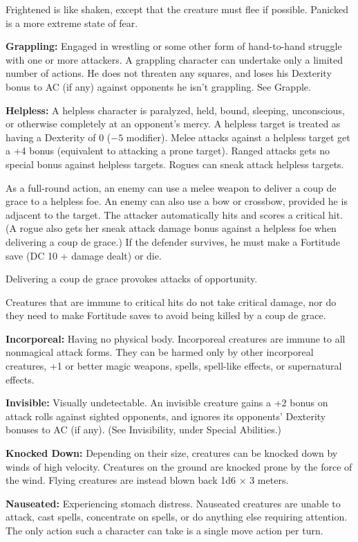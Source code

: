 Frightened is like shaken, except that the creature must flee if possible. Panicked is a more extreme state of fear.

\textbf{Grappling:} Engaged in wrestling or some other form of hand-to-hand struggle with one or more attackers. A grappling character can undertake only a limited number of actions. He does not threaten any squares, and loses his Dexterity bonus to AC (if any) against opponents he isn't grappling. See Grapple.

\textbf{Helpless:} A helpless character is paralyzed, held, bound, sleeping, unconscious, or otherwise completely at an opponent's mercy. A helpless target is treated as having a Dexterity of 0 ($-5$ modifier). Melee attacks against a helpless target get a +4 bonus (equivalent to attacking a prone target). Ranged attacks gets no special bonus against helpless targets. Rogues can sneak attack helpless targets.

As a full-round action, an enemy can use a melee weapon to deliver a coup de grace to a helpless foe. An enemy can also use a bow or crossbow, provided he is adjacent to the target. The attacker automatically hits and scores a critical hit. (A rogue also gets her sneak attack damage bonus against a helpless foe when delivering a coup de grace.) If the defender survives, he must make a Fortitude save (DC 10 + damage dealt) or die.

Delivering a coup de grace provokes attacks of opportunity.

Creatures that are immune to critical hits do not take critical damage, nor do they need to make Fortitude saves to avoid being killed by a coup de grace.

\textbf{Incorporeal:} Having no physical body. Incorporeal creatures are immune to all nonmagical attack forms. They can be harmed only by other incorporeal creatures, +1 or better magic weapons, spells, spell-like effects, or supernatural effects.

\textbf{Invisible:} Visually undetectable. An invisible creature gains a +2 bonus on attack rolls against sighted opponents, and ignores its opponents' Dexterity bonuses to AC (if any). (See Invisibility, under Special Abilities.)

\textbf{Knocked Down:} Depending on their size, creatures can be knocked down by winds of high velocity. Creatures on the ground are knocked prone by the force of the wind. Flying creatures are instead blown back 1d6 $\times$ 3 meters.

\textbf{Nauseated:} Experiencing stomach distress. Nauseated creatures are unable to attack, cast spells, concentrate on spells, or do anything else requiring attention. The only action such a character can take is a single move action per turn.

